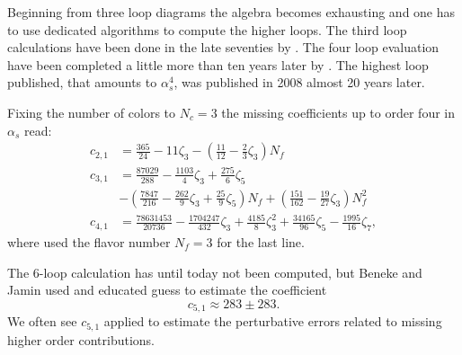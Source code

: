 \documentclass[../../index.tex]{subfiles}
\begin{document}
Beginning from three loop diagrams the algebra becomes exhausting and one has to
use dedicated algorithms to compute the higher loops. The third loop
calculations have been done in the late seventies by
\cite{Chetyrkin1979,Dine1979,Celmaster1979}. The four loop evaluation have been
completed a little more than ten years later by
\cite{Gorishnii1990,Surguladze1990}. The highest loop published, that amounts to
$\alpha_s^4$, was published in 2008 \cite{Baikov2008} almost 20 years later.

Fixing the number of colors to $N_c=3$ the missing coefficients up to order four
in $\alpha_s$ read:
\begin{equation}
  \label{eq:adlerCoefficients}
  \begin{split}
    c_{2,1} &= \frac{365}{24} - 11 \zeta_3 - \left( \frac{11}{12} - \frac{2}{3}\zeta_3 \right) N_f \\
    c_{3,1} &= \frac{87029}{288} - \frac{1103}{4} \zeta_3 + \frac{275}{6}\zeta_5 \\
    &- \left( \frac{7847}{216} - \frac{262}{9} \zeta_3 + \frac{25}{9} \zeta_5 \right) N_f + \left( \frac{151}{162} - \frac{19}{27}\zeta_3\right)N_f^2 \\
    c_{4,1} &= \frac{78631453}{20736} - \frac{1704247}{432}\zeta_3 +
    \frac{4185}{8}\zeta_3^2 + \frac{34165}{96}\zeta_5 - \frac{1995}{16}\zeta_7,
  \end{split}
\end{equation}
where used the flavor number $N_f=3$ for the last line.

The 6-loop calculation has until today not been computed, but Beneke and Jamin
\cite{Beneke2008} used and educated guess to estimate the coefficient
\begin{equation}
  c_{5,1} \approx 283 \pm 283.
\end{equation}
We often see \(c_{5,1}\) applied to estimate the perturbative errors related to
missing higher order contributions.
\end{document}
